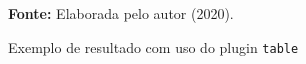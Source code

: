 \begin{figure}[ht!]
\centering

\caption{\textmd{Exemplo de resultado com uso do plugin \texttt{table}}}
\label{fig:tableeditorres}

\par\medskip\textbf{Fonte:} Elaborada pelo autor (2020). \par\medskip

\end{figure}

